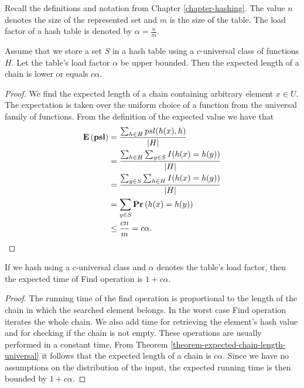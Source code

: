 Recall the definitions and notation from Chapter \ref{chapter-hashing}. The value $n$ denotes the size of the represented set and $m$ is the size of the table. The load factor of a hash table is denoted by $\alpha = \frac{n}{m}$. 

\begin{theorem}
\label{theorem-expected-chain-length-universal}
Assume that we store a set $S$ in a hash table using a $c$-universal class of functions $H$. Let the table's load factor $\alpha$ be upper bounded. Then the expected length of a chain is lower or equals $c \alpha$.
\end{theorem}
\begin{proof}
We find the expected length of a chain containing arbitrary element $x \in U$. The expectation is taken over the uniform choice of a function from the universal family of functions. From the definition of the expected value we have that
\begin{displaymath}
\begin{split}
\mathbf{E}\left(\mathbf{psl}\right) 
	& = \frac{\sum\displaylimits_{h \in H} psl(h(x), h) }{|H|} \\
	& = \frac{\sum\displaylimits_{h \in H} \sum\displaylimits_{y \in S} I(h(x) = h(y))}{|H|} \\
	& = \frac{\sum\displaylimits_{y \in S} \sum\displaylimits_{h \in H} I(h(x) = h(y))}{|H|}  \\
	& = \sum\displaylimits_{y \in S} \mathbf{Pr}\left(h(x) = h(y)\right) \\
	& \leq \frac{cn}{m} = c \alpha \text{.}
\end{split}
\end{displaymath}
\end{proof}

\begin{corollary}
\label{corollary-c-universal-find}
If we hash using a $c$-universal class and $\alpha$ denotes the table's load factor, then the expected time of Find operation is $1 + c\alpha$.
\end{corollary}
\begin{proof}
The running time of the find operation is proportional to the length of the chain in which the searched element belongs. In the worst case Find operation iterates the whole chain. We also add time for retrieving the element's hash value and for checking if the chain is not empty. These operations are usually performed in a constant time. From Theorem \ref{theorem-expected-chain-length-universal} it follows that the expected length of a chain is $c\alpha$. Since we have no assumptions on the distribution of the input, the expected running time is then bounded by $1 + c\alpha$. 
\end{proof}

